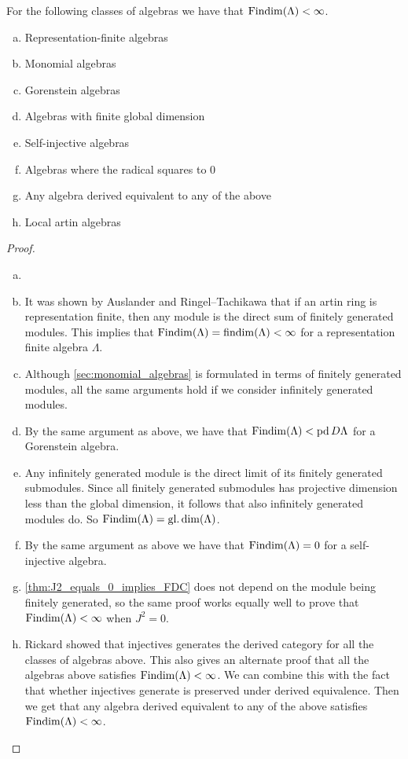 \begin{theorem}
	For the following classes of algebras we have that $\operatorname{Findim}(\Lambda) < \infty$.
	\begin{enumerate}[a)]
		\item Representation-finite algebras
		\item Monomial algebras
		\item Gorenstein algebras
		\item Algebras with finite global dimension
		\item Self-injective algebras
		\item Algebras where the radical squares to 0
		\item Any algebra derived equivalent to any of the above
		\item Local artin algebras
	\end{enumerate}
	\begin{proof}
		\begin{enumerate}[(a)]
			\item[]
			\item It was shown by Auslander and Ringel--Tachikawa that if an artin ring is representation finite, then any module is the direct sum of finitely generated modules\cite{Aus74}\cite[Corollary~4.4]{RT74}. This implies that $\operatorname{Findim}(\Lambda) = \operatorname{findim}(\Lambda) < \infty$ for a representation finite algebra $\Lambda$.
			\item Although \cref{sec:monomial_algebras} is formulated in terms of finitely generated modules, all the same arguments hold if we consider infinitely generated modules. 
			\item \label{item:Findim_gorenstein} By the same argument as above, we have that $\operatorname{Findim}(\Lambda) < \operatorname{pd} D\Lambda$ for a Gorenstein algebra.
			\item Any infinitely generated module is the direct limit of its finitely generated submodules. Since all finitely generated submodules has projective dimension less than the global dimension, it follows that also infinitely generated modules do. So $\operatorname{Findim}(\Lambda) = \operatorname{gl.dim}(\Lambda)$.
			\item By the same argument as above we have that $\operatorname{Findim}(\Lambda) = 0$ for a self-injective algebra.
			\item \cref{thm:J2_equals_0_implies_FDC} does not depend on the module being finitely generated, so the same proof works equally well to prove that $\operatorname{Findim}(\Lambda) < \infty$ when $J^2 = 0$.
			\item Rickard showed that injectives generates the derived category for all the classes of algebras above\cite[Theoreom~3.2, Corrolary~7.(4-6)]{Rick19}. This also gives an alternate proof that all the algebras above satisfies $\operatorname{Findim}(\Lambda) < \infty$. We can combine this with the fact that whether injectives generate is preserved under derived equivalence\cite[Theorem3.4]{Rick19}. Then we get that any algebra derived equivalent to any of the above satisfies $\operatorname{Findim}(\Lambda) < \infty$.

\end{enumerate}
\end{proof}
\end{theorem}
